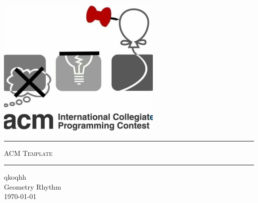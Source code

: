 \begin{titlepage}
	\pagestyle{plain}
	\begin{center}
		\vspace*{0.5cm}
		\includegraphics[scale=1.2]{./cover.png}\\ [2cm]
		\hrule 
		\vspace{0.5cm}
		\fontsize{48pt}{\baselineskip}\selectfont \textsc{ACM Template}\\
		\vspace{0.5cm}
		\hrule 
		\vspace{2cm}
		\huge{qkoqhh}\\
		\vspace{1cm}
		\huge{Geometry Rhythm}\\
		\vspace{2cm}
		\large{\today}
	\end{center}	
\end{titlepage}